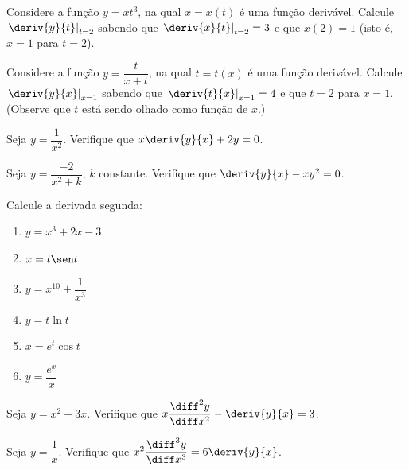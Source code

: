 \begin{exercicio}[4]
\label{ex:7.9.4}
Considere a função $y = xt^3$, na qual $x = x(t)$ é uma função derivável. Calcule $\left.\deriv{y}{t}\right|_{t = 2}$ sabendo que $\left.\deriv{x}{t}\right|_{t = 2} = 3$ e que $x(2) = 1$ (isto é, $x = 1$ para $t = 2$).
\end{exercicio}

\begin{exercicio}[5]
\label{ex:7.9.5}
Considere a função $y = \dfrac{t}{x + t}$, na qual $t = t(x)$ é uma função derivável. Calcule $\left.\deriv{y}{x}\right|_{x = 1}$ sabendo que $\left.\deriv{t}{x}\right|_{x = 1} = 4$ e que $t = 2$ para $x = 1$. (Observe que $t$ está sendo olhado como função de $x$.)
\end{exercicio}

\begin{exercicio}[6]
\label{ex:7.9.6}
Seja $y = \dfrac{1}{x^2}$. Verifique que $x\deriv{y}{x} + 2y = 0$.
\end{exercicio}

\begin{exercicio}[7]
\label{ex:7.9.7}
Seja $y = \dfrac{-2}{x^2 + k}$, $k$ constante. Verifique que $\deriv{y}{x} - xy^2 = 0$.
\end{exercicio}

\begin{exercicio}[8]
\label{ex:7.9.8}
Calcule a derivada segunda:
\begin{enumerate}[label=\alph*)]
    \item $y = x^3 + 2x - 3$
    \item $x = t \sen t$
    \item $y = x^{10} + \dfrac{1}{x^3}$
    \item $y = t \ln t$
    \item $x = e^t \cos t$
    \item $y = \dfrac{e^x}{x}$
\end{enumerate}
\end{exercicio}

\begin{exercicio}[9]
\label{ex:7.9.9}
Seja $y = x^2 - 3x$. Verifique que $x \dfrac{\diff^2 y}{\diff x^2} - \deriv{y}{x} = 3$.
\end{exercicio}

\begin{exercicio}[10]
\label{ex:7.9.10}
Seja $y = \dfrac{1}{x}$. Verifique que $x^2 \dfrac{\diff^3 y}{\diff x^3} = 6 \deriv{y}{x}$.
\end{exercicio}

